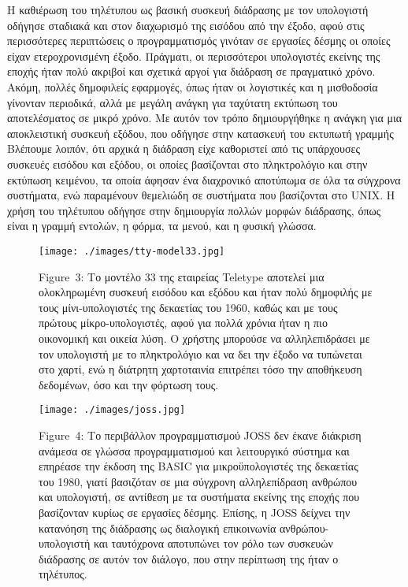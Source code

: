 \documentclass[
]{article}
\begin{document}
Η καθιέρωση του τηλέτυπου ως βασική συσκευή διάδρασης με τον υπολογιστή
οδήγησε σταδιακά και στον διαχωρισμό της εισόδου από την έξοδο, αφού
στις περισσότερες περιπτώσεις ο προγραμματισμός γινόταν σε εργασίες
δέσμης οι οποίες είχαν ετεροχρονισμένη έξοδο. Πράγματι, οι περισσότεροι
υπολογιστές εκείνης της εποχής ήταν πολύ ακριβοί και σχετικά αργοί για
διάδραση σε πραγματικό χρόνο. Ακόμη, πολλές δημοφιλείς εφαρμογές, όπως
ήταν οι λογιστικές και η μισθοδοσία γίνονταν περιοδικά, αλλά με μεγάλη
ανάγκη για ταχύτατη εκτύπωση του αποτελέσματος σε μικρό χρόνο. Με αυτόν
τον τρόπο δημιουργήθηκε η ανάγκη για μια αποκλειστική συσκευή εξόδου,
που οδήγησε στην κατασκευή του εκτυπωτή γραμμής Βλέπουμε λοιπόν, ότι
αρχικά η διάδραση είχε καθοριστεί από τις υπάρχουσες συσκευές εισόδου
και εξόδου, οι οποίες βασίζονται στο πληκτρολόγιο και στην εκτύπωση
κειμένου, τα οποία άφησαν ένα διαχρονικό αποτύπωμα σε όλα τα σύγχρονα
συστήματα, ενώ παραμένουν θεμελιώδη σε συστήματα που βασίζονται στο
UNIX. Η χρήση του τηλέτυπου οδήγησε στην δημιουργία πολλών μορφών
διάδρασης, όπως είναι η γραμμή εντολών, η φόρμα, τα μενού, και η φυσική
γλώσσα.

\leavevmode{}%
\begin{figure}
\hypertarget{fig:tty-model33}{%
\centering
\texttt{[image: ./images/tty-model33.jpg]}
\caption{Figure~3: Το μοντέλο 33 της εταιρείας Teletype αποτελεί μια
ολοκληρωμένη συσκευή εισόδου και εξόδου και ήταν πολύ δημοφιλής με τους
μίνι-υπολογιστές της δεκαετίας του 1960, καθώς και με τους πρώτους
μίκρο-υπολογιστές, αφού για πολλά χρόνια ήταν η πιο οικονομική και
οικεία λύση. Ο χρήστης μπορούσε να αλληλεπιδράσει με τον υπολογιστή με
το πληκτρολόγιο και να δει την έξοδο να τυπώνεται στο χαρτί, ενώ η
διάτρητη χαρτοταινία επιτρέπει τόσο την αποθήκευση δεδομένων, όσο και
την φόρτωση τους.}\label{fig:tty-model33}
}
\end{figure}

\leavevmode{}%
\begin{figure}
\hypertarget{fig:joss}{%
\centering
\texttt{[image: ./images/joss.jpg]}
\caption{Figure~4: Το περιβάλλον προγραμματισμού JOSS δεν έκανε διάκριση
ανάμεσα σε γλώσσα προγραμματισμού και λειτουργικό σύστημα και επηρέασε
την έκδοση της BASIC για μικροϋπολογιστές της δεκαετίας του 1980, γιατί
βασιζόταν σε μια σύγχρονη αλληλεπίδραση ανθρώπου και υπολογιστή, σε
αντίθεση με τα συστήματα εκείνης της εποχής που βασίζονταν κυρίως σε
εργασίες δέσμης. Επίσης, η JOSS δείχνει την κατανόηση της διάδρασης ως
διαλογική επικοινωνία ανθρώπου-υπολογιστή και ταυτόχρονα αποτυπώνει τον
ρόλο των συσκευών διάδρασης σε αυτόν τον διάλογο, που στην περίπτωση της
ήταν ο τηλέτυπος.}\label{fig:joss}
}
\end{figure}
\end{document}
